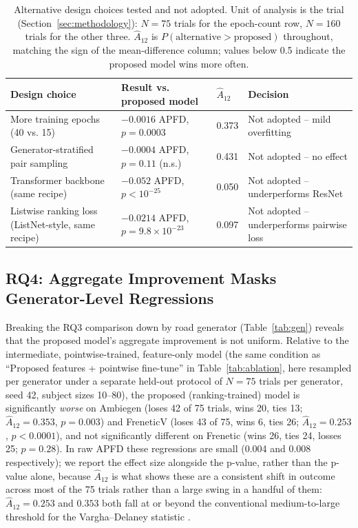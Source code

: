 \documentclass[smallextended]{svjour3}
\begin{document}
\begin{table}[t]
\caption{Alternative design choices tested and not adopted. Unit of
analysis is the trial (Section~\ref{sec:methodology}): $N=75$ trials for
the epoch-count row, $N=160$ trials for the other three. $\hat{A}_{12}$ is
$P(\text{alternative} > \text{proposed})$ throughout, matching the sign of
the mean-difference column; values below 0.5 indicate the proposed model
wins more often.}
\label{tab:design}
\begin{tabular}{p{2.7cm}p{3.0cm}p{1.3cm}p{2.3cm}}
\toprule
Design choice & Result vs. proposed model & $\hat{A}_{12}$ & Decision \\
\midrule
More training epochs (40 vs. 15) & $-0.0016$ APFD, $p=0.0003$ & 0.373 & Not adopted -- mild overfitting \\
Generator-stratified pair sampling & $-0.0004$ APFD, $p=0.11$ (n.s.) & 0.431 & Not adopted -- no effect \\
Transformer backbone (same recipe) & $-0.052$ APFD, $p<10^{-25}$ & 0.050 & Not adopted -- underperforms ResNet \\
Listwise ranking loss (ListNet-style, same recipe) & $-0.0214$ APFD, $p=9.8\times10^{-23}$ & 0.097 & Not adopted -- underperforms pairwise loss \\
\bottomrule
\end{tabular}
\end{table}

\subsection{RQ4: Aggregate Improvement Masks Generator-Level Regressions}
\label{sec:rq4}
Breaking the RQ3 comparison down by road generator (Table~\ref{tab:gen})
reveals that the proposed model's aggregate improvement is not uniform.
Relative to the intermediate, pointwise-trained, feature-only model (the
same condition as ``Proposed features + pointwise fine-tune'' in
Table~\ref{tab:ablation}, here resampled per generator under a separate
held-out protocol of $N=75$ trials per generator, seed 42, subject sizes
10--80), the proposed (ranking-trained) model is significantly
\emph{worse} on Ambiegen (loses 42 of 75 trials, wins 20, ties 13;
$\hat{A}_{12}=0.353$, $p=0.003$) and FreneticV (loses 43 of 75, wins 6,
ties 26; $\hat{A}_{12}=0.253$, $p<0.0001$), and not significantly
different on Frenetic (wins 26, ties 24, losses 25; $p=0.28$). In raw APFD
these regressions are small (0.004 and 0.008 respectively); we report the
effect size alongside the p-value, rather than the p-value alone, because
$\hat{A}_{12}$ is what shows these are a consistent shift in outcome across
most of the 75 trials rather than a large swing in a handful of them:
$\hat{A}_{12}=0.253$ and $0.353$ both fall at or beyond the conventional
medium-to-large threshold for the Vargha--Delaney statistic
\citep{vargha2000critique}.
\end{document}
